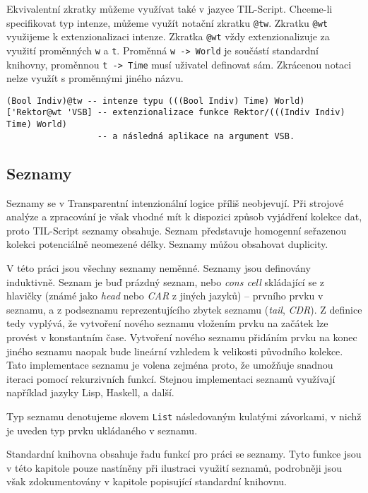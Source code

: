 Ekvivalentní zkratky můžeme využívat také v jazyce TIL-Script. Chceme-li specifikovat typ intenze,
můžeme využít notační zkratku \lstinline{@tw}. Zkratku \lstinline{@wt} využijeme k extenzionalizaci
intenze. Zkratka \lstinline{@wt} vždy extenzionalizuje za využití proměnných \lstinline{w} a
\lstinline{t}. Proměnná \lstinline{w -> World} je součástí standardní knihovny, proměnnou
\lstinline{t -> Time} musí uživatel definovat sám. Zkrácenou notaci nelze využít s proměnnými
jiného názvu.

\begin{lstlisting}[caption={Příklad využití zkrácené notace}]
(Bool Indiv)@tw -- intenze typu (((Bool Indiv) Time) World)
['Rektor@wt 'VSB] -- extenzionalizace funkce Rektor/(((Indiv Indiv) Time) World)
                  -- a následná aplikace na argument VSB.
\end{lstlisting}

\subsection{Seznamy}

Seznamy se v Transparentní intenzionální logice příliš neobjevují. Při strojové analýze a
zpracování je však vhodné mít k dispozici způsob vyjádření kolekce dat, proto TIL-Script seznamy
obsahuje. Seznam představuje homogenní seřazenou kolekci potenciálně neomezené délky. Seznamy můžou
obsahovat duplicity.

V této práci jsou všechny seznamy neměnné. Seznamy jsou definovány induktivně. Seznam je buď
prázdný seznam, nebo \textit{cons cell} skládající se z hlavičky (známé jako \textit{head} nebo
\textit{CAR} z jiných jazyků) -- prvního prvku v seznamu, a z podseznamu reprezentujícího
zbytek seznamu (\textit{tail}, \textit{CDR}). Z definice tedy vyplývá, že vytvoření nového seznamu
vložením prvku na začátek lze provést v konstantním čase. Vytvoření nového seznamu přidáním prvku
na konec jiného seznamu naopak bude lineární vzhledem k velikosti původního kolekce. Tato
implementace seznamu je volena zejména proto, že umožňuje snadnou iteraci pomocí rekurzivních funkcí.
Stejnou implementaci seznamů využívají například jazyky Lisp, Haskell, a další.

Typ seznamu denotujeme slovem \lstinline{List} následovaným kulatými závorkami, v nichž je uveden
typ prvku ukládaného v seznamu.

Standardní knihovna obsahuje řadu funkcí pro práci se seznamy. Tyto funkce jsou v této kapitole
pouze nastíněny při ilustraci využití seznamů, podrobněji jsou však zdokumentovány v kapitole
popisující standardní knihovnu.

